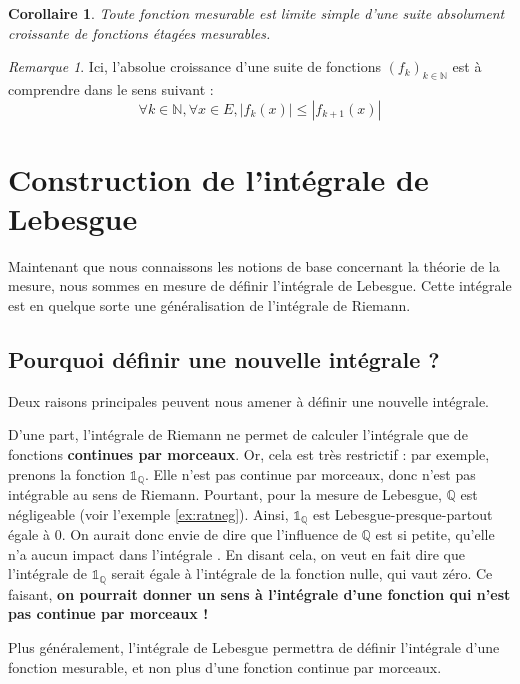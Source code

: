 \documentclass[french]{report}
\theoremstyle{plain}
\newtheorem{cor}{Corollaire}[section]
\theoremstyle{definition}
\theoremstyle{remark}
\newtheorem{rem}{Remarque}[section]
\begin{document}
\begin{cor}
  Toute fonction mesurable est limite simple d'une suite absolument croissante de fonctions étagées mesurables.
\end{cor}

\begin{rem}
  Ici, l'absolue croissance d'une suite de fonctions $\left(f_k\right)_{k\in \mathbb{N}}$ est à comprendre dans le sens suivant :
  $$
  \forall k \in \mathbb{N}, \forall x \in E, \left|f_k(x)\right| \leq \left|f_{k+1}(x)\right|
  $$
\end{rem}

\chapter{Construction de l'intégrale de Lebesgue}

Maintenant que nous connaissons les notions de base concernant la théorie de la mesure, nous sommes en mesure de définir l'intégrale de Lebesgue.
Cette intégrale est en quelque sorte une généralisation de l'intégrale de Riemann.

\section{Pourquoi définir une nouvelle intégrale ?}

Deux raisons principales peuvent nous amener à définir une nouvelle intégrale.

D'une part, l'intégrale de Riemann ne permet de calculer l'intégrale que de fonctions \textbf{continues par morceaux}.
Or, cela est très restrictif : par exemple, prenons la fonction $\mathds{1}_{\mathbb{Q}}$.
Elle n'est pas continue par morceaux, donc n'est pas intégrable au sens de Riemann.
Pourtant, pour la mesure de Lebesgue, $\mathbb{Q}$ est négligeable (voir l'exemple \ref{ex:ratneg}).
Ainsi, $\mathds{1}_{\mathbb{Q}}$ est Lebesgue-presque-partout égale à $0$.
On aurait donc envie de dire que \og l'influence de $\mathbb{Q}$ est si petite, qu'elle n'a aucun impact dans l'intégrale \fg.
En disant cela, on veut en fait dire que l'intégrale de $\mathds{1}_{\mathbb{Q}}$ serait égale à l'intégrale de la fonction nulle, qui vaut zéro.
Ce faisant, \textbf{on pourrait donner un sens à l'intégrale d'une fonction qui n'est pas continue par morceaux !}

Plus généralement, l'intégrale de Lebesgue permettra de définir l'intégrale d'une fonction mesurable, et non plus d'une fonction continue par morceaux.
\end{document}
